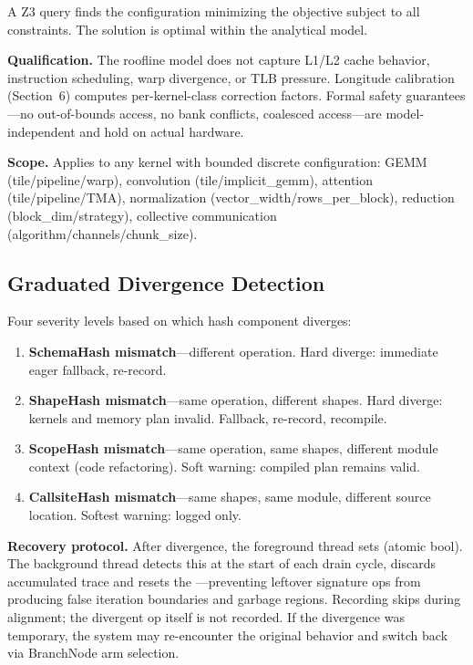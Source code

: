 A Z3  query finds the configuration minimizing the objective subject to all constraints.
The solution is optimal within the analytical model.

\textbf{Qualification.}
The roofline model does not capture L1/L2 cache behavior, instruction scheduling, warp divergence, or TLB pressure.
Longitude calibration (Section~6) computes per-kernel-class correction factors.
Formal safety guarantees---no out-of-bounds access, no bank conflicts, coalesced access---are model-independent and hold on actual hardware.

\textbf{Scope.}
Applies to any kernel with bounded discrete configuration: GEMM (tile/pipeline/warp), convolution (tile/implicit\_gemm), attention (tile/pipeline/TMA), normalization (vector\_width/rows\_per\_block), reduction (block\_dim/strategy), collective communication (algorithm/channels/chunk\_size).

\subsection{Graduated Divergence Detection}

Four severity levels based on which hash component diverges:

\begin{enumerate}
  \item \textbf{SchemaHash mismatch}---different operation. Hard diverge: immediate eager fallback, re-record.
  \item \textbf{ShapeHash mismatch}---same operation, different shapes. Hard diverge: kernels and memory plan invalid. Fallback, re-record, recompile.
  \item \textbf{ScopeHash mismatch}---same operation, same shapes, different module context (code refactoring). Soft warning: compiled plan remains valid.
  \item \textbf{CallsiteHash mismatch}---same shapes, same module, different source location. Softest warning: logged only.
\end{enumerate}

\textbf{Recovery protocol.}
After divergence, the foreground thread sets  (atomic bool).
The background thread detects this at the start of each drain cycle, discards accumulated trace and resets the ---preventing leftover signature ops from producing false iteration boundaries and garbage regions.
Recording skips during alignment; the divergent op itself is not recorded.
If the divergence was temporary, the system may re-encounter the original behavior and switch back via BranchNode arm selection.

